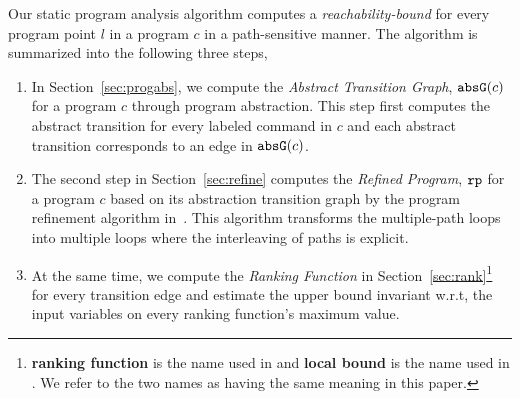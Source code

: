 Our static program analysis algorithm computes 
a \emph{reachability-bound} for every program point $l$ in a program $c$ in a path-sensitive manner.
The algorithm is summarized into the following three steps,
\begin{enumerate}
\item In Section~\ref{sec:progabs}, we 
compute the \emph{Abstract Transition Graph}, $\mathtt{abs}{\mathtt{G}}(c)$ for a program $c$ through program abstraction.
This step first computes the abstract transition 
for every labeled command in $c$ and each abstract transition corresponds to an edge in $\mathtt{abs}{\mathtt{G}}(c)$.
\item The second step in Section~\ref{sec:refine}
computes the \emph{Refined Program}, $\mathtt{rp}$ for a program $c$ based on 
its abstraction transition graph by the program refinement algorithm in~\cite{GulwaniJK09}.
This algorithm transforms the multiple-path loops
into multiple loops where
the interleaving of paths is explicit.

\item At the same time, we compute the \emph{Ranking Function} in Section~\ref{sec:rank}\footnote{\textbf{ranking function} is the name used in \cite{SinnZV14}
and \textbf{local bound} is the name used in \cite{ZulegerGSV11, SinnZV17}.
We refer to the two names as having the same meaning in this paper.} for every transition edge 
and estimate the upper bound invariant w.r.t, the input variables on every ranking function's maximum value.


\end{enumerate}
